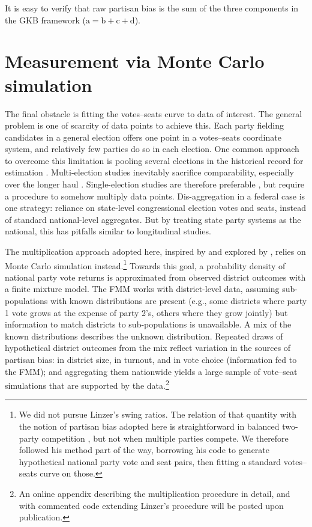 \documentclass[letter,12pt]{article}
\begin{document}
\noindent It is easy to verify that raw partisan bias is the sum of the three components in the GKB framework ($\text{a}=\text{b}+\text{c}+\text{d}$). 

\section{Measurement via Monte Carlo simulation}

The final obstacle is fitting the votes--seats curve to data of interest. The general problem is one of scarcity of data points to achieve this. Each party fielding candidates in a general election offers one point in a votes--seats coordinate system, and relatively few parties do so in each election. One common approach to overcome this limitation is pooling several elections in the historical record for estimation \citep[e.g.,][]{marquez2014biasBlog}. Multi-election studies inevitably sacrifice comparability, especially over the longer haul \citep{jackmanMeasuringBias1994}. Single-election studies are therefore preferable \citep{niemi.fett1986swing}, but require a procedure to somehow multiply data points. Dis-aggregation in a federal case is one strategy: reliance on state-level congressional election votes and seats, instead of standard national-level aggregates. But by treating state party systems as the national, this has pitfalls similar to longitudinal studies.

The multiplication approach adopted here, inspired by \citet{linzerSeatVoteElasticity2012} and explored by \citet{marquez2014mixSwingBlog}, relies on Monte Carlo simulation instead.\footnote{We did not pursue Linzer's swing ratios. The relation of that quantity with the notion of partisan bias adopted here is straightforward in balanced two-party competition \citep[see][:410]{linzerSeatVoteElasticity2012}, but not when multiple parties compete. We therefore followed his method part of the way, borrowing his code to generate hypothetical national party vote and seat pairs, then fitting a standard votes--seats curve on those.} Towards this goal, a probability density of national party vote returns is approximated from observed district outcomes with a finite mixture model. The FMM works with district-level data, assuming sub-populations with known distributions are present (e.g., some districts where party 1 vote grows at the expense of party 2's, others where they grow jointly) but information to match districts to sub-populations is unavailable. A mix of the known distributions describes the unknown distribution. Repeated draws of hypothetical district outcomes from the mix reflect variation in the sources of partisan bias: in district size, in turnout, and in vote choice (information fed to the FMM); and aggregating them nationwide yields a large sample of vote--seat simulations that are supported by the data.\footnote{An online appendix describing the multiplication procedure in detail, and with commented code extending Linzer's procedure will be posted upon publication.} 
\end{document}
